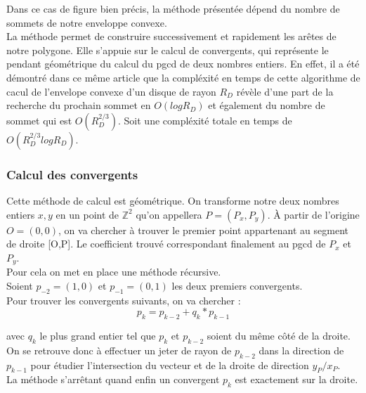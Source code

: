 Dans ce cas de figure bien précis, la méthode présentée dépend du nombre de sommets de notre enveloppe convexe. \\

La méthode permet de construire successivement et rapidement les arêtes de notre polygone. Elle s'appuie sur le calcul de convergents, qui représente le pendant géométrique du calcul du pgcd de deux nombres entiers. 
En effet, il a été démontré dans ce même article que la compléxité en temps de cette algorithme de cacul de l'envelope convexe d'un disque de rayon $R_D$ révèle d'une part de la recherche du prochain sommet en $O(log R_D)$ et également du nombre de sommet qui est $O( R_{D}^{2/3})$. Soit une compléxité totale en temps de  $O( R_{D}^{2/3} log R_D)$.


\subsubsection{Calcul des convergents}

Cette méthode de calcul est géométrique. On transforme notre deux nombres entiers $x, y$ en un point de $\mathbb{Z}^{2}$ qu'on appellera $P = (P_x, P_y)$. À partir de l’origine $O=(0,0)$, on va chercher à trouver le premier point appartenant au segment de droite [O,P]. Le coefficient trouvé correspondant finalement au pgcd de $P_x$ et $P_y$.\\

Pour cela on met en place une méthode récursive.\\
Soient $p_{-2} = (1,0)$ et $p_{-1} = (0,1)$ les deux premiers convergents.\\

Pour trouver les convergents suivants, on va chercher :
$$p_{k} = p_{k-2} + q_k * p_{k-1}$$

avec $q_k$ le plus grand entier tel que $p_{k}$ et $p_{k-2}$ soient du même côté de la droite.\\

On se retrouve donc à effectuer un jeter de rayon de $p_{k-2}$ dans la direction de $p_{k-1}$ pour étudier l’intersection du vecteur et de la droite de direction $y_P / x_P$.\\

La méthode s’arrêtant quand enfin un convergent $p_{k}$ est exactement sur la droite.


